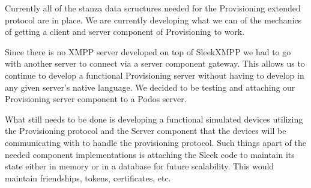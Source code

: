 Currently all of the stanza data scructures needed for the Provisioning extended
protocol are in place. We are currently developing what we can of the mechanics
of getting a client and server component of Provisioning to work.

Since there is no XMPP server developed on top of SleekXMPP we had to go with
another server to connect via a server component gateway. This allows us to
continue to develop a functional Provisioning server without having to develop
in any given server’s native language. We decided to be testing and attaching
our Provisioning server component to a Podos server.

What still needs to be done is developing a functional simulated devices
utilizing the Provisioning protocol and the Server component that the devices
will be communicating with to handle the provisioning protocol. Such things
apart of the needed component implementations is attaching the Sleek code to
maintain its state either in memory or in a database for future scalability.
This would maintain friendships, tokens, certificates, etc.
